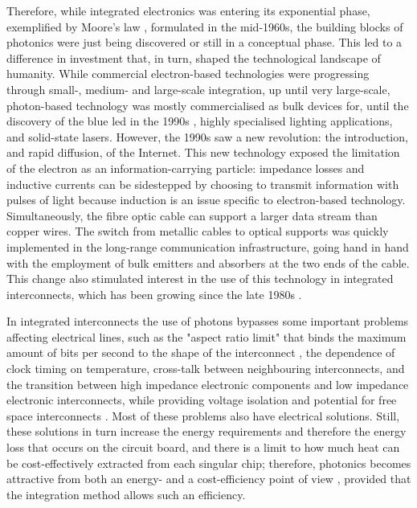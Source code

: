 Therefore, while integrated electronics was entering its exponential phase, exemplified by Moore's law \cite{Moore1965}, formulated in the mid-1960s, the building blocks of photonics were just being discovered or still in a conceptual phase. This led to a difference in investment that, in turn, shaped the technological landscape of humanity. While commercial electron-based technologies were progressing through small-, medium- and large-scale integration, up until very large-scale, photon-based technology was mostly commercialised as bulk devices for, until the discovery of the blue \acs{led} in the 1990s \cite{Nakamura1994}, highly specialised lighting applications, and solid-state lasers. However, the 1990s saw a new revolution: the introduction, and rapid diffusion, of the Internet. This new technology exposed the limitation of the electron as an information-carrying particle: impedance losses and inductive currents can be sidestepped by choosing to transmit information with pulses of light because induction is an issue specific to electron-based technology. Simultaneously, the fibre optic cable can support a larger data stream than copper wires. The switch from metallic cables to optical supports was quickly implemented in the long-range communication infrastructure, going hand in hand with the employment of bulk emitters and absorbers at the two ends of the cable. This change also stimulated interest in the use of this technology in integrated interconnects, which has been growing since the late 1980s \cite{Miller1989}.

In integrated interconnects the use of photons bypasses some important problems affecting electrical lines, such as the "aspect ratio limit" that binds the maximum amount of bits per second to the shape of the interconnect \cite{Miller1997}, the dependence of clock timing on temperature, cross-talk between neighbouring interconnects, and the transition between high impedance electronic components and low impedance electronic interconnects, while providing voltage isolation and potential for free space interconnects \cite{Miller1997_reasons}. Most of these problems also have electrical solutions. Still, these solutions in turn increase the energy requirements and therefore the energy loss that occurs on the circuit board, and there is a limit to how much heat can be cost-effectively extracted from each singular chip; therefore, photonics becomes attractive from both an energy- and a cost-efficiency point of view \cite{Miller2009}, provided that the integration method allows such an efficiency. 

